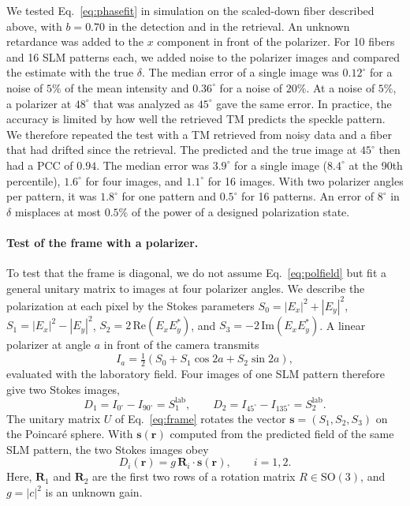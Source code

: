 \documentclass{article}
\begin{document}
We tested Eq.~\eqref{eq:phasefit} in simulation on the scaled-down fiber described above, with $b=0.70$ in the detection and in the retrieval.
An unknown retardance was added to the $x$ component in front of the polarizer.
For 10 fibers and 16 SLM patterns each, we added noise to the polarizer images and compared the estimate with the true $\delta$.
The median error of a single image was $0.12^\circ$ for a noise of $5\%$ of the mean intensity and $0.36^\circ$ for a noise of $20\%$.
At a noise of $5\%$, a polarizer at $48^\circ$ that was analyzed as $45^\circ$ gave the same error.
In practice, the accuracy is limited by how well the retrieved TM predicts the speckle pattern.
We therefore repeated the test with a TM retrieved from noisy data and a fiber that had drifted since the retrieval.
The predicted and the true image at $45^\circ$ then had a PCC of $0.94$.
The median error was $3.9^\circ$ for a single image ($8.4^\circ$ at the 90th percentile), $1.6^\circ$ for four images, and $1.1^\circ$ for 16 images.
With two polarizer angles per pattern, it was $1.8^\circ$ for one pattern and $0.5^\circ$ for 16 patterns.
An error of $8^\circ$ in $\delta$ misplaces at most $0.5\%$ of the power of a designed polarization state.

\paragraph{Test of the frame with a polarizer.}
To test that the frame is diagonal, we do not assume Eq.~\eqref{eq:polfield} but fit a general unitary matrix to images at four polarizer angles.
We describe the polarization at each pixel by the Stokes parameters $S_0=|E_x|^2+|E_y|^2$, $S_1=|E_x|^2-|E_y|^2$, $S_2=2\,\mathrm{Re}(E_xE_y^*)$, and $S_3=-2\,\mathrm{Im}(E_xE_y^*)$.
A linear polarizer at angle $a$ in front of the camera transmits
\begin{equation}
I_a=\tfrac{1}{2}\left(S_0+S_1\cos2a+S_2\sin2a\right),
\end{equation}
evaluated with the laboratory field.
Four images of one SLM pattern therefore give two Stokes images,
\begin{equation}
D_1=I_{0^\circ}-I_{90^\circ}=S_1^{\mathrm{lab}},\qquad D_2=I_{45^\circ}-I_{135^\circ}=S_2^{\mathrm{lab}}.
\end{equation}
The unitary matrix $U$ of Eq.~\eqref{eq:frame} rotates the vector $\mathbf{s}=(S_1,S_2,S_3)$ on the Poincar\'e sphere.
With $\mathbf{s}(\mathbf{r})$ computed from the predicted field of the same SLM pattern, the two Stokes images obey
\begin{equation}
\label{eq:stokesmodel}
D_i(\mathbf{r})=g\,\mathbf{R}_i\cdot\mathbf{s}(\mathbf{r}),\qquad i=1,2.
\end{equation}
Here, $\mathbf{R}_1$ and $\mathbf{R}_2$ are the first two rows of a rotation matrix $R\in\mathrm{SO}(3)$, and $g=|c|^2$ is an unknown gain.
\end{document}

